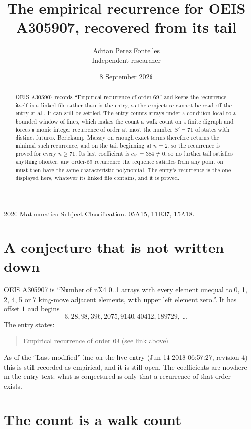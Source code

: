 \documentclass[11pt,a4paper]{article}
\title{The empirical recurrence for OEIS A305907, recovered from its tail}
\author{Adrian Perez Fontelles\\ \small Independent researcher}
\date{8 September 2026}
\theoremstyle{plain}
\theoremstyle{definition}
\begin{document}
\maketitle

\begin{abstract}
OEIS A305907 records ``Empirical recurrence of order $69$'' and keeps the recurrence itself in
a linked file rather than in the entry, so the conjecture cannot be read off the entry at all.
It can still be settled. The entry counts arrays under a condition local to a bounded window of
lines, which makes the count a walk count on a finite digraph and forces a monic integer
recurrence of order at most the number $S'=71$ of states with distinct futures. Berlekamp--Massey on
enough exact terms therefore returns the minimal such recurrence, and on the tail beginning at $n=2$, so the recurrence is proved for every $n\ge71$.
Its last coefficient is $c_{69}=384\neq0$, so no further tail satisfies anything
shorter; any order-$69$ recurrence the sequence satisfies from any point on must then have
the same characteristic polynomial. The entry's recurrence is the one displayed here, whatever
its linked file contains, and it is proved.
\end{abstract}

\noindent\small 2020 Mathematics Subject Classification. 05A15, 11B37, 15A18.\normalsize

\section{A conjecture that is not written down}

OEIS A305907 is ``Number of nX4 0..1 arrays with every element unequal to 0, 1, 2, 4, 5 or 7 king-move adjacent elements, with upper left element zero.''. It has offset $1$ and begins
\[
8, 28, 98, 396, 2075, 9140, 40412, 189729,\ \dots
\]
The entry states:
\begin{quote}
Empirical recurrence of order 69 (see link above)
\end{quote}
As of the ``Last modified'' line on the live entry (Jun 14 2018 06:57:27, revision 4)
this is still recorded as empirical, and it is still open. The coefficients are nowhere in the
entry text: what is conjectured is only that a recurrence of that order exists.

\section{The count is a walk count}
\end{document}
